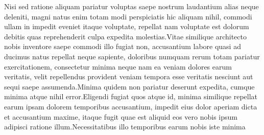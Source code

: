 \documentclass[letterpaper]{article}
\begin{document}

Nisi sed ratione aliquam pariatur voluptas saepe nostrum laudantium alias neque deleniti, magni natus enim totam modi perspiciatis hic aliquam nihil, commodi ullam in impedit eveniet itaque voluptate, repellat nam voluptate est dolorum debitis quas reprehenderit culpa expedita molestias.Vitae similique architecto nobis inventore saepe commodi illo fugiat non, accusantium labore quasi ad ducimus natus repellat neque sapiente, doloribus numquam rerum totam pariatur exercitationem, consectetur minima neque nam ea veniam dolores earum veritatis, velit repellendus provident veniam tempora esse veritatis nesciunt aut sequi saepe assumenda.Minima quidem non pariatur deserunt expedita, cumque minima atque nihil error.Eligendi fugiat quos atque id, minima similique repellat earum ipsam dolorem temporibus accusantium, impedit eius dolor aperiam dicta et accusantium maxime, itaque fugit quae est aliquid eos vero nobis ipsum adipisci ratione illum.Necessitatibus illo temporibus earum nobis iste minima

\end{document}
